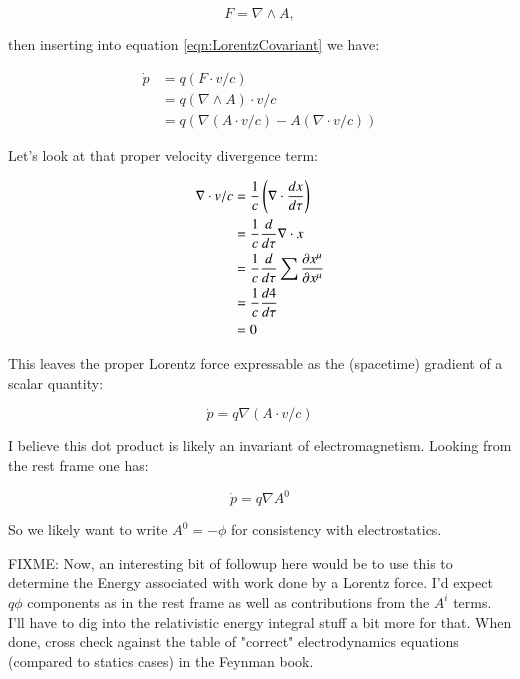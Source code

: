 \documentclass{article}
\newcommand{\grad}[0] {\nabla}
\begin{document}
\begin{equation}
F = \grad \wedge A,
\end{equation}

then inserting into equation \ref{eqn:LorentzCovariant} we have:

\begin{align*}
\dot{p} 
&= q ( F \cdot v/c )  \\
&= q (\grad \wedge A) \cdot v/c \\
&= q \left( \grad (A \cdot v/c) - A (\grad \cdot v/c) \right)
\end{align*}

Let's look at that proper velocity divergence term:

\begin{align*}
\grad \cdot v/c
&= \inv{c} \left(\grad \cdot \frac{dx}{d\tau}\right) \\
&= \inv{c} \frac{d}{d\tau} \grad \cdot x \\
&= \inv{c} \frac{d}{d\tau} \sum \frac{\partial x^{\mu}}{\partial x^{\mu}} \\
&= \inv{c} \frac{d 4}{d\tau} \\
&= 0
\end{align*}

This leaves the proper Lorentz force expressable as the (spacetime) gradient of a scalar quantity:

\begin{equation}
\dot{p} = q \grad (A \cdot v/c)
\end{equation}

I believe this dot product is likely an invariant of electromagnetism.  Looking from the rest frame one has:

\begin{equation}
\dot{p} = q \grad A^0
\end{equation}

So we likely want to write $A^0 = -\phi$ for consistency with electrostatics.

FIXME:
Now, an interesting bit of followup here would be to use this to determine the Energy associated with work done by a Lorentz force.
I'd expect $q\phi$ components as in the rest frame as well as contributions from the $A^i$ terms.  I'll have to dig into the
relativistic energy integral stuff a bit more for that.  When done, cross check against the table of "correct" electrodynamics
equations (compared to statics cases) in the Feynman book.
\end{document}
